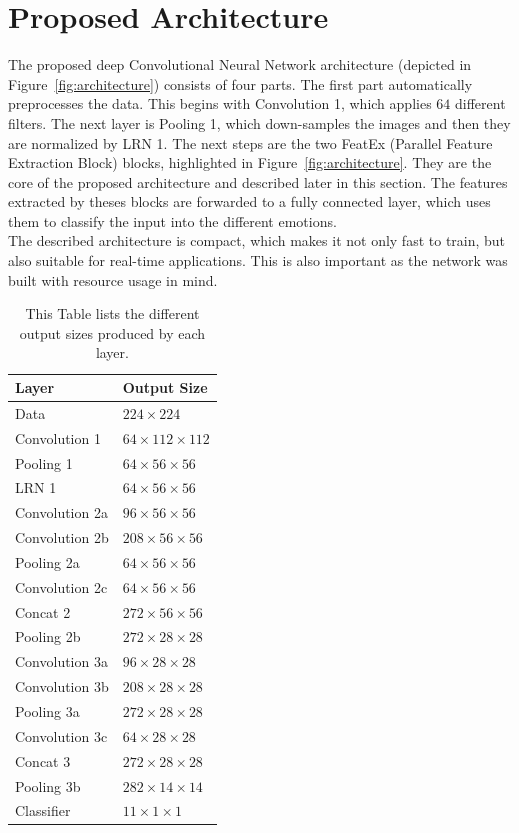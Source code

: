 \section{Proposed Architecture}
\label{sec:architecture}


The proposed deep Convolutional Neural Network architecture (depicted in Figure~\ref{fig:architecture}) consists of four parts. The first part automatically preprocesses the data. This begins with Convolution 1, which applies $64$ different filters. The next layer is Pooling 1, which down-samples the images and then they are normalized by LRN 1. The next steps are the two FeatEx (Parallel Feature Extraction Block) blocks, highlighted in Figure~\ref{fig:architecture}. They are the core of the proposed architecture and described later in this section. The features extracted by theses blocks are forwarded to a fully connected layer, which uses them to classify the input into the different emotions.\\
The described architecture is compact, which makes it not only fast to train, but also suitable for real-time applications. This is also important as the network was built with resource usage in mind.

\begin{table}[ht!]
\centering
\caption{This Table lists the different output sizes produced by each layer.}
\label{tab:layers}

\begin{tabular}{l|l}
\hline
Layer & Output Size \\
\hline
Data & $224 \times 224$\\
Convolution 1 & $64 \times 112 \times 112$\\
Pooling 1 & $64 \times 56 \times 56$ \\
LRN 1 & $64 \times 56 \times 56$\\
\hline

Convolution 2a & $96 \times 56 \times 56$\\
Convolution 2b & $208 \times 56 \times 56$\\
Pooling 2a & $64 \times 56 \times 56$\\
Convolution 2c & $64 \times 56 \times 56$\\
Concat 2 & $272 \times 56 \times 56$\\
Pooling 2b & $272 \times 28 \times 28$\\
\hline

Convolution 3a & $96 \times 28 \times 28$\\
Convolution 3b & $208 \times 28 \times 28$\\
Pooling 3a & $272 \times 28 \times 28$\\
Convolution 3c & $64 \times 28 \times 28$\\
Concat 3 & $272 \times 28 \times 28$\\
Pooling 3b & $282 \times 14 \times 14$\\
\hline

Classifier & $11 \times 1 \times 1$\\
\hline
\end{tabular}
\end{table}

